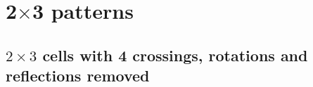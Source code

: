 \chapter{2$\times$3 patterns}

\section{$2\times 3$ cells with 4 crossings, rotations and reflections removed}


